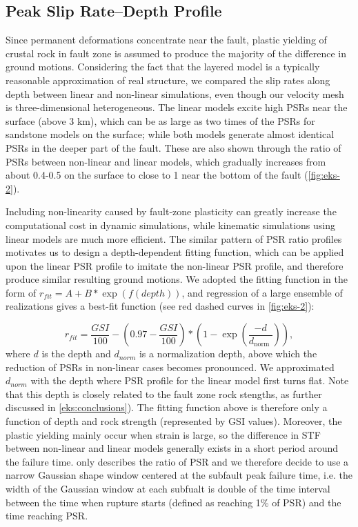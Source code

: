 \subsection{Peak Slip Rate–Depth Profile}\label{eks:methods}
Since permanent deformations concentrate near the fault, plastic yielding of crustal rock in fault zone is assumed to produce the majority of the difference in ground motions. Considering the fact that the layered model is a typically reasonable approximation of real structure, we compared the slip rates along depth between linear and non-linear simulations, even though our velocity mesh is three-dimensional heterogeneous. The linear models excite high PSRs near the surface (above 3 km), which can be as large as two times of the PSRs for sandstone models on the surface; while both models generate almost identical PSRs in the deeper part of the fault. These are also shown through the ratio of PSRs between non-linear and linear models, which gradually increases from about 0.4-0.5 on the surface to close to 1 near the bottom of the fault (\cref{fig:eks-2}).

Including non-linearity caused by fault-zone plasticity can greatly increase the computational cost in dynamic simulations, while kinematic simulations using linear models are much more efficient. The similar pattern of PSR ratio profiles motivates us to design a depth-dependent fitting function, which can be applied upon the linear PSR profile to imitate the non-linear PSR profile, and therefore produce similar resulting ground motions. We adopted the fitting function in the form of $r_{fit}=A+B * \exp \left(f(depth)\right)$, and regression of a large ensemble of realizations gives a best-fit function (see red dashed curves in \cref{fig:eks-2}):

\begin{equation}\label{eq:eks-2}
    r_{f i t}=\frac{G S I}{100} - \left(0.97-\frac{G S I}{100}\right) * (1 - \exp \left(\frac{-d}{d_{\text {norm }}}\right)),
\end{equation}
where $d$ is the depth and $d_{norm}$ is a normalization depth, above which the reduction of PSRs in non-linear cases becomes pronounced. We approximated $d_{norm}$ with the depth where PSR profile for the linear model first turns flat. Note that this depth is closely related to the fault zone rock stengths, as further discussed in \cref{eks:conclusions}). The fitting function above is therefore only a function of depth and rock strength (represented by GSI values). Moreover, the plastic yielding mainly occur when strain is large, so the difference in STF between non-linear and linear models generally exists in a short period around the failure time.  only describes the ratio of PSR and we therefore decide to use a narrow Gaussian shape window centered at the subfault peak failure time, i.e. the width of the Gaussian window at each subfualt is double of the time interval between the time when rupture starts (defined as reaching 1\% of PSR) and the time reaching PSR.

